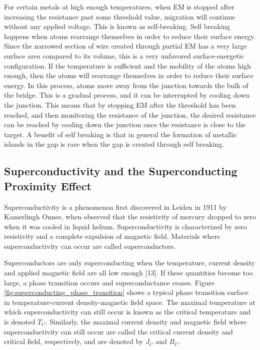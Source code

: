 \noindent For certain metals at high enough temperatures, when EM is stopped after increasing the resistance past some threshold value, migration will continue without any applied voltage. This is known as self-breaking. Self breaking happens when atoms rearrange themselves in order to reduce their surface energy. Since the narrowed section of wire created through partial EM has a very large surface area compared to its volume, this is a very unfavored surface-energetic configuration. If the temperature is sufficient and the mobility of the atoms high enough, then the atoms will rearrange themselves in order to reduce their surface energy. In this process, atoms move away from the junction towards the bulk of the bridge. This is a gradual process, and it can be interrupted by cooling down the junction. This means that by stopping EM after the threshold has been reached, and then monitoring the resistance of the junction, the desired resistance can be reached by cooling down the junction once the resistance is close to the target. A benefit of self breaking is that in general the formation of metallic islands in the gap is rare when the gap is created through self breaking.


\subsection{Superconductivity and the Superconducting Proximity Effect}


Superconductivity is a phenomenon first discovered in Leiden in 1911 by Kamerlingh Onnes, when observed that the resistivity of mercury dropped to zero when it was cooled in liquid helium. Superconductivity is characterized by zero resistivity and a complete expulsion of magnetic field. Materials where superconductivity can occur are called superconductors. 

Superconductors are only superconducting when the temperature, current density and applied magnetic field are all low enough [13]. If these quantities become too large, a phase transition occurs and superconductance ceases. Figure \ref{fig:superconducting_phase_transition} shows a typical phase transition surface in temperature-current density-magnetic field space. The maximal temperature at which superconductivity can still occur is known as the critical temperature and is denoted $T_C$. Similarly, the maximal current density and magnetic field where superconductivity can still occur are called the critical current density and critical field, respectively, and are denoted by $J_C$ and $B_C$.


